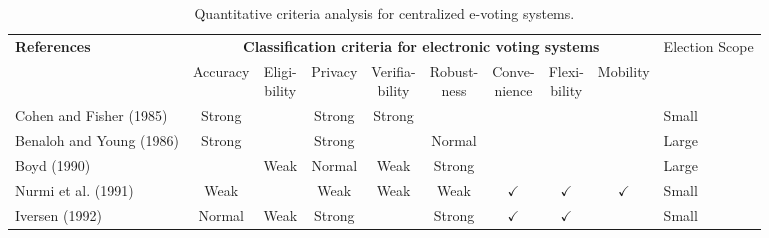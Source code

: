 \documentclass[../access.tex]{subfiles}
\begin{document}
    \begin{table}[htbp]
        \footnotesize
        \caption{Quantitative criteria analysis for centralized e-voting systems.}
            \begin{adjustwidth}{-2cm}{}
                \begin{tabular}{m{4.4cm} c c c c c c c c >{\centering\arraybackslash}m{1cm}} %
                    \toprule
                    \multirow{3.5}{=}{\textbf{\footnotesize{References}}} & \multicolumn{8}{c}{\textbf{\footnotesize{Classification criteria for electronic voting systems}}} & \multirow{3.5}{=}{\footnotesize{Election Scope}} \\
                    \cline{2-9}
                    \vspace{0.5cm}
                    \multirow{2}{=}{} & \parbox[m]{1cm}{\footnotesize{Accuracy}} & \parbox[m]{0.7cm}{\footnotesize{Eligi-\\bility}} & \parbox[m]{0.9cm}{\footnotesize{Privacy}} & \parbox[m]{1.0cm}{\footnotesize{Verifia-\\bility}} & \parbox[m]{1.0cm}{\footnotesize{Robust-\\ness}} & \parbox[m]{0.9cm}{\footnotesize{Conve-\\nience}} & \parbox[m]{0.8cm}{\footnotesize{Flexi-\\bility}} & \parbox[m]{0.85cm}{\footnotesize{Mobility}} &  \\
                    \hline
                    \footnotesize{Cohen and Fisher (1985) \cite{Cohen1985}} & {Strong} & {} & {Strong} & {Strong} & {} & {} & {} & {} & \footnotesize{Small} \\
                    \hline
                    \footnotesize{Benaloh and Young (1986) \cite{Benaloh1986a}} & {Strong} & {} & {Strong} & {} & {Normal} & {} & {} & {} & \footnotesize{Large} \\
                    \hline
                    \footnotesize{Boyd (1990) \cite{Boyd1990}} & {} & {Weak} & {Normal} & {Weak} & {Strong} & {} & {} & {} & \footnotesize{Large} \\
                    \hline
                    \footnotesize{Nurmi et al. (1991) \cite{Nurmi1991}} & {Weak} & {} & {Weak} & {Weak} & {Weak} & $ \checkmark $ & $ \checkmark $ & $ \checkmark $ & \footnotesize{Small} \\
                    \hline
                    \footnotesize{Iversen (1992) \cite{Iversen1992}} & {Normal} & {Weak} & {Strong} & {} & {Strong} & $ \checkmark $ & $ \checkmark $ & {} & \footnotesize{Small} \\

\end{tabular}
\end{adjustwidth}
\end{table}
\end{document}
